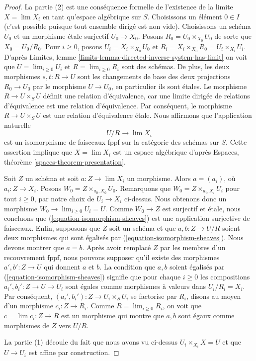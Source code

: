 \begin{proof}
La partie (2) est une conséquence formelle de l'existence de la
limite $X = \lim X_i$ en tant qu'espace algébrique sur $S$.
Choisissons un élément $0 \in I$ (c'est possible puisque tout ensemble dirigé est non vide).
Choisissons un schéma $U_0$ et un morphisme
\'etale surjectif $U_0 \to X_0$. Posons $R_0 = U_0 \times_{X_0} U_0$
de sorte que $X_0 = U_0/R_0$. Pour $i \geq 0$, posons
$U_i = X_i \times_{X_0} U_0$ et
$R_i = X_i \times_{X_0} R_0 = U_i \times_{X_i} U_i$.
D'après Limites, lemme \ref{limits-lemma-directed-inverse-system-has-limit}
on voit que $U = \lim_{i \geq 0} U_i$ et $R = \lim_{i \geq 0} R_i$
sont des schémas. De plus, les deux morphismes $s, t : R \to U$ sont les
changements de base des deux projections $R_0 \to U_0$ par le morphisme
$U \to U_0$, en particulier ils sont \'etales. Le morphisme $R \to U \times_S U$
définit une relation d'équivalence, car une limite dirigée de relations d'équivalence
est une relation d'équivalence. Par conséquent, le morphisme
$R \to U \times_S U$ est une relation d'équivalence \'etale. Nous affirmons que
l'application naturelle
\begin{equation}
\label{equation-isomorphism-sheaves}
U/R \longrightarrow \lim X_i
\end{equation}
est un isomorphisme de faisceaux fppf sur la catégorie des schémas sur $S$.
Cette assertion implique que $X = \lim X_i$ est un espace algébrique
d'après Espaces, théorème \ref{spaces-theorem-presentation}.

\medskip\noindent
Soit $Z$ un schéma et soit $a : Z \to \lim X_i$ un morphisme.
Alors $a = (a_i)$, où $a_i : Z \to X_i$. Posons $W_0 = Z \times_{a_0, X_0} U_0$.
Remarquons que $W_0 = Z \times_{a_i, X_i} U_i$ pour tout $i \geq 0$, par notre
choix de $U_i \to X_i$ ci-dessus. Nous obtenons donc un morphisme
$W_0 \to \lim_{i \geq 0} U_i = U$. Comme $W_0 \to Z$ est surjectif
et \'etale, nous concluons que (\ref{equation-isomorphism-sheaves})
est une application surjective de faisceaux. Enfin, supposons que
$Z$ soit un schéma et que $a, b : Z \to U/R$ soient deux morphismes
qui sont égalisés par (\ref{equation-isomorphism-sheaves}).
Nous devons montrer que $a = b$.
Après avoir remplacé $Z$ par les membres d'un recouvrement fppf,
nous pouvons supposer qu'il existe des morphismes $a', b' : Z \to U$ qui
donnent $a$ et $b$. La condition que $a, b$ soient égalisés par
(\ref{equation-isomorphism-sheaves}) signifie que
pour chaque $i \geq 0$ les compositions $a_i', b_i' : Z \to U \to U_i$
sont égales comme morphismes à valeurs dans $U_i/R_i = X_i$. Par conséquent,
$(a_i', b_i') : Z \to U_i \times_S U_i$ se factorise par
$R_i$, disons au moyen d'un morphisme $c_i : Z \to R_i$. Comme
$R = \lim_{i \geq 0} R_i$, on voit que $c = \lim c_i : Z \to R$
est un morphisme qui montre que $a, b$ sont égaux comme morphismes
de $Z$ vers $U/R$.

\medskip\noindent
La partie (1) découle du fait que nous avons vu ci-dessus
$U_i \times_{X_i} X = U$ et que $U \to U_i$ est affine par
construction.
\end{proof}

